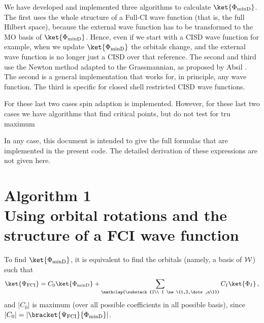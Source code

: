 \documentclass[a4paper,11pt]{article}
\begin{document}
We have developed and implemented three algorithms to calculate $\ket{\Phi_\text{minD}}$.
The first uses the whole structure of a Full-CI wave function (that is, the full Hilbert space), because the external wave function has to be transformed to the MO basis of $\ket{\Phi_\text{minD}}$.
Hence, even if we start with a CISD wave function for example, when we update $\ket{\Phi_\text{minD}}$ the orbitals change, and the external wave function is no longer just a CISD over that reference.
The second and third use the Newton method adapted to the Grassmannian, as proposed by Absil \etal{} \cite{}.
The second is a general implementation that works for, in principle, any wave function.
The third is specific for closed shell restricted CISD wave functions.

For these last two cases spin adaption is implemented.
However, for these last two cases we have algorithms that find critical points, but do not test for tru maximum

In any case, this document is intended to give the full formulas that are implemented in the present code.
The detailed derivation of these expressions are not given here.


\newpage
\section{\textsf{\LARGE Algorithm 1}\\Using orbital rotations and the structure of a FCI wave function}

To find $\ket{\Phi_\text{minD}}$, it is equivalent to find the orbitals (namely, a basis of $\mathcal{W}{}$) such that 
\begin{equation}
  \ket{\Psi_\text{FCI}} = C_0 \ket{\Phi_\text{minD}} +
  \sum_{
    \mathclap{\substack{I\\
        I \ne \{1,2,\dots,n\}}}
      }
    C_I \ket{\Phi_I}\,,
\end{equation}
and $|C_0|$ is maximum (over all possible coefficients in all possible basis), since $|C_0| = |\bracket{\Psi_\text{FCI}}{\Phi_\text{minD}}|$.
\end{document}
